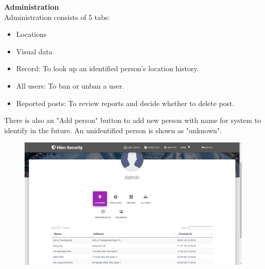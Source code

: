 \textbf{Administration}
\\
Administration consists of 5 tabs:
\begin{itemize}
\item Locations
\item Visual data
\item Record: To look up an identified person's location history.
\item All users: To ban or unban a user.
\item Reported posts: To review reports and decide whether to delete post.
\end{itemize}
There is also an "Add person" button to add new person with name for system to identify in the future. An unidentified person is shown as "unknown".
\begin{center}
    \begin{figure}[H]
    \centering
    \includegraphics[width=1\columnwidth]{images/chap4/admin.png}
    \end{figure}
\end{center}
